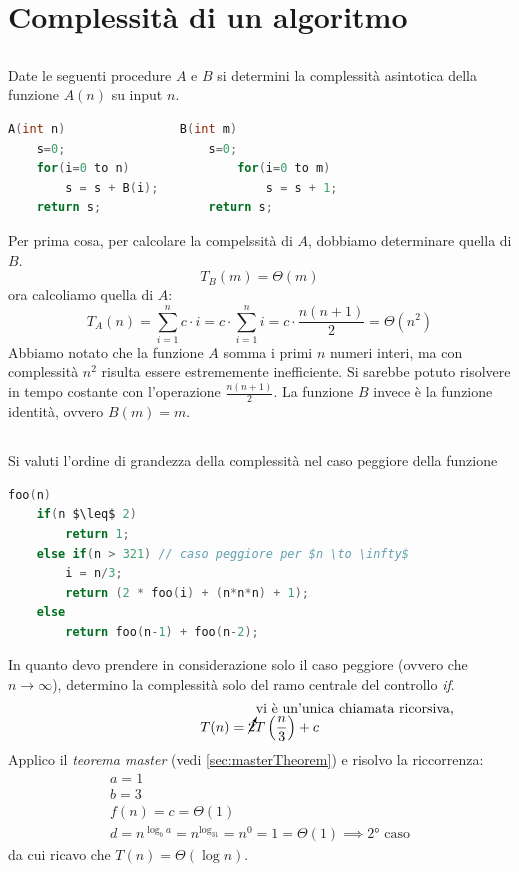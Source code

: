 \documentclass[italian]{article}
\newcommand{\fn}{f(n)}
\newcommand{\exercize}{\text{\faPencil $\;$ Esercizio }}
\begin{document}
\section{Complessità di un algoritmo}
\subsection{\exercize}
Date le seguenti procedure $A$ e $B$ si determini la complessità asintotica della funzione $A(n)$ su input $n$.
\begin{lstlisting}[language=c,mathescape=true]
A(int n)				B(int m)
	s=0;					s=0;
	for(i=0 to n)				for(i=0 to m)
		s = s + B(i);				s = s + 1;
	return s;				return s;
\end{lstlisting}
Per prima cosa, per calcolare la compelssità di $A$, dobbiamo determinare quella di $B$.
\[
	T_B(m) = \varTheta(m) 
\]
ora calcoliamo quella di $A$:
\[
	T_A(n) = \sum_{i=1}^{n}c\cdot i = c \cdot \sum_{i=1}^{n} i = c \cdot \frac{n(n+1)}{2} = \varTheta(n^2) 
\]
Abbiamo notato che la funzione $A$ somma i primi $n$ numeri interi, ma con complessità $n^2$ risulta essere estrememente inefficiente. Si sarebbe potuto risolvere in tempo costante con l'operazione $\frac{n(n+1)}{2}$. La funzione $B$ invece è la funzione identità, ovvero $B(m) = m$.

\subsection{\exercize}
Si valuti l'ordine di grandezza della complessità nel caso peggiore della funzione
\begin{lstlisting}[language=c,mathescape=true]
foo(n)
	if(n $\leq$ 2)
		return 1;
	else if(n > 321) // caso peggiore per $n \to \infty$
		i = n/3;
		return (2 * foo(i) + (n*n*n) + 1);
	else
		return foo(n-1) + foo(n-2);
\end{lstlisting}
In quanto devo prendere in considerazione solo il caso peggiore (ovvero che $n \to \infty$), determino la complessità solo del ramo centrale del controllo \textit{if}.
\[
	T(n) = \cancelto{\text{vi è un'unica chiamata ricorsiva, non 2}}{2}T\left(\frac{n}{3}\right) + c
\]
Applico il \textit{teorema master} (vedi \ref{sec:masterTheorem})  e risolvo la riccorrenza:
\begin{gather*}
	a = 1\\
	b = 3 \\
	\fn = c = \varTheta(1) \\
	d = n^{\log_ba} = n^{\log_31} = n^0 = 1 = \varTheta(1) \implies \text{2° caso}
\end{gather*}
da cui ricavo che $T(n) = \varTheta(\log n)$.
\pagebreak
\end{document}
